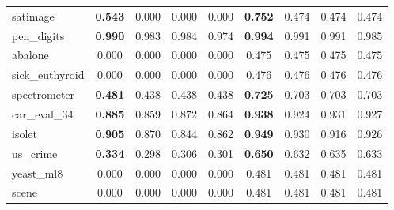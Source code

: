 \begin{figure}[ht]
\begin{tabular}{p{22mm}|*4{p{14mm}}|*4{p{14mm}}}
        satimage&\multicolumn{1}{c}{\textbf{0.543}}&\multicolumn{1}{c}{0.000}&\multicolumn{1}{c}{0.000}&\multicolumn{1}{c|}{0.000}&\multicolumn{1}{c}{\textbf{0.752}}&\multicolumn{1}{c}{0.474}&\multicolumn{1}{c}{0.474}&\multicolumn{1}{c}{0.474}\\
        pen\_digits&\multicolumn{1}{c}{\textbf{0.990}}&\multicolumn{1}{c}{0.983}&\multicolumn{1}{c}{0.984}&\multicolumn{1}{c|}{0.974}&\multicolumn{1}{c}{\textbf{0.994}}&\multicolumn{1}{c}{0.991}&\multicolumn{1}{c}{0.991}&\multicolumn{1}{c}{0.985}\\
        abalone&\multicolumn{1}{c}{0.000}&\multicolumn{1}{c}{0.000}&\multicolumn{1}{c}{0.000}&\multicolumn{1}{c|}{0.000}&\multicolumn{1}{c}{0.475}&\multicolumn{1}{c}{0.475}&\multicolumn{1}{c}{0.475}&\multicolumn{1}{c}{0.475}\\
        sick\_euthyroid&\multicolumn{1}{c}{0.000}&\multicolumn{1}{c}{0.000}&\multicolumn{1}{c}{0.000}&\multicolumn{1}{c|}{0.000}&\multicolumn{1}{c}{0.476}&\multicolumn{1}{c}{0.476}&\multicolumn{1}{c}{0.476}&\multicolumn{1}{c}{0.476}\\
        spectrometer&\multicolumn{1}{c}{\textbf{0.481}}&\multicolumn{1}{c}{0.438}&\multicolumn{1}{c}{0.438}&\multicolumn{1}{c|}{0.438}&\multicolumn{1}{c}{\textbf{0.725}}&\multicolumn{1}{c}{0.703}&\multicolumn{1}{c}{0.703}&\multicolumn{1}{c}{0.703}\\
        car\_eval\_34&\multicolumn{1}{c}{\textbf{0.885}}&\multicolumn{1}{c}{0.859}&\multicolumn{1}{c}{0.872}&\multicolumn{1}{c|}{0.864}&\multicolumn{1}{c}{\textbf{0.938}}&\multicolumn{1}{c}{0.924}&\multicolumn{1}{c}{0.931}&\multicolumn{1}{c}{0.927}\\
        isolet&\multicolumn{1}{c}{\textbf{0.905}}&\multicolumn{1}{c}{0.870}&\multicolumn{1}{c}{0.844}&\multicolumn{1}{c|}{0.862}&\multicolumn{1}{c}{\textbf{0.949}}&\multicolumn{1}{c}{0.930}&\multicolumn{1}{c}{0.916}&\multicolumn{1}{c}{0.926}\\
        us\_crime&\multicolumn{1}{c}{\textbf{0.334}}&\multicolumn{1}{c}{0.298}&\multicolumn{1}{c}{0.306}&\multicolumn{1}{c|}{0.301}&\multicolumn{1}{c}{\textbf{0.650}}&\multicolumn{1}{c}{0.632}&\multicolumn{1}{c}{0.635}&\multicolumn{1}{c}{0.633}\\
        yeast\_ml8&\multicolumn{1}{c}{0.000}&\multicolumn{1}{c}{0.000}&\multicolumn{1}{c}{0.000}&\multicolumn{1}{c|}{0.000}&\multicolumn{1}{c}{0.481}&\multicolumn{1}{c}{0.481}&\multicolumn{1}{c}{0.481}&\multicolumn{1}{c}{0.481}\\
        scene&\multicolumn{1}{c}{0.000}&\multicolumn{1}{c}{0.000}&\multicolumn{1}{c}{0.000}&\multicolumn{1}{c|}{0.000}&\multicolumn{1}{c}{0.481}&\multicolumn{1}{c}{0.481}&\multicolumn{1}{c}{0.481}&\multicolumn{1}{c}{0.481}\\

\end{tabular}
\end{figure}
